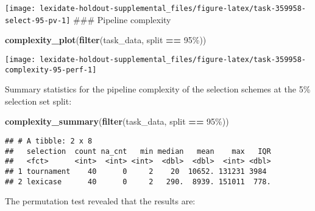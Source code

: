 \documentclass[
]{book}
\newenvironment{Shaded}{\begin{snugshade}}{\end{snugshade}}
\newcommand{\AttributeTok}[1]{\textcolor[rgb]{0.13,0.29,0.53}{#1}}
\newcommand{\DecValTok}[1]{\textcolor[rgb]{0.00,0.00,0.81}{#1}}
\newcommand{\FunctionTok}[1]{\textcolor[rgb]{0.13,0.29,0.53}{\textbf{#1}}}
\newcommand{\NormalTok}[1]{#1}
\newcommand{\OtherTok}[1]{\textcolor[rgb]{0.56,0.35,0.01}{#1}}
\newcommand{\SpecialCharTok}[1]{\textcolor[rgb]{0.81,0.36,0.00}{\textbf{#1}}}
\newcommand{\StringTok}[1]{\textcolor[rgb]{0.31,0.60,0.02}{#1}}
\begin{document}
\texttt{[image: lexidate-holdout-supplemental\_files/figure-latex/task-359958-select-95-pv-1]}
\#\#\# Pipeline complexity

\begin{Shaded}
\begin{Highlighting}[]
\FunctionTok{complexity\_plot}\NormalTok{(}\FunctionTok{filter}\NormalTok{(task\_data, split }\SpecialCharTok{==} \StringTok{\textquotesingle{}95\%\textquotesingle{}}\NormalTok{))}
\end{Highlighting}
\end{Shaded}

\texttt{[image: lexidate-holdout-supplemental\_files/figure-latex/task-359958-complexity-95-perf-1]}

Summary statistics for the pipeline complexity of the selection schemes at the 5\% selection set split:

\begin{Shaded}
\begin{Highlighting}[]
\FunctionTok{complexity\_summary}\NormalTok{(}\FunctionTok{filter}\NormalTok{(task\_data, split }\SpecialCharTok{==} \StringTok{\textquotesingle{}95\%\textquotesingle{}}\NormalTok{))}
\end{Highlighting}
\end{Shaded}

\begin{verbatim}
## # A tibble: 2 x 8
##   selection  count na_cnt   min median   mean    max   IQR
##   <fct>      <int>  <int> <int>  <dbl>  <dbl>  <int> <dbl>
## 1 tournament    40      0     2    20  10652. 131231 3984 
## 2 lexicase      40      0     2   290.  8939. 151011  778.
\end{verbatim}

The permutation test revealed that the results are:

\begin{Shaded}
\end{Shaded}
\end{document}
